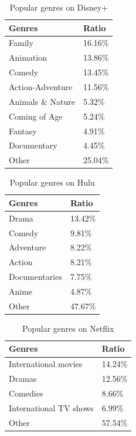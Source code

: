 \documentclass{article}
\begin{document}
\begin{table}[!htb]
	\centering
	\caption{Popular genres on Disney+}
	\label{tab:disney_plus_genres}
	\begin{tabular}{@{}ll@{}}
	\toprule
	Genres            & Ratio   \\ \midrule
	Family            & 16.16\% \\
	Animation         & 13.86\% \\
	Comedy            & 13.45\% \\
	Action-Adventure  & 11.56\% \\
	Animals \& Nature & 5.32\%  \\
	Coming of Age     & 5.24\%  \\
	Fantasy           & 4.91\%  \\
	Documentary       & 4.45\%  \\
	Other             & 25.04\% \\ \bottomrule
	\end{tabular}
\end{table}
\begin{table}[!htb]
	\centering
	\caption{Popular genres on Hulu}
	\label{tab:hulu_genres}
	\begin{tabular}{@{}ll@{}}
	\toprule
	Genres        & Ratio   \\ \midrule
	Drama         & 13.42\% \\
	Comedy        & 9.81\%  \\
	Adventure     & 8.22\%  \\
	Action        & 8.21\%  \\
	Documentaries & 7.75\%  \\
	Anime         & 4.87\%  \\
	Other         & 47.67\% \\ \bottomrule
	\end{tabular}
\end{table}
\begin{table}[!htb]
	\centering
	\caption{Popular genres on Netflix}
	\label{tab:netflix_genres}
	\begin{tabular}{@{}ll@{}}
	\toprule
	Genres                 & Ratio   \\ \midrule
	International movies   & 14.24\% \\
	Dramas                 & 12.56\% \\
	Comedies               & 8.66\%  \\
	International TV shows & 6.99\%  \\
	Other                  & 57.54\% \\ \bottomrule
	\end{tabular}
\end{table}
\end{document}
